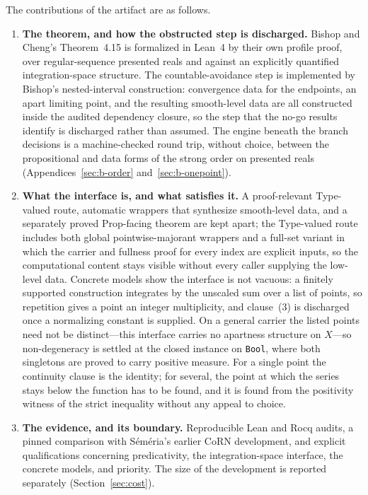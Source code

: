 \documentclass[11pt]{article}
\theoremstyle{definition}
\theoremstyle{remark}
\begin{document}
The contributions of the artifact are as follows.
\begin{enumerate}[label=(\arabic*)]
\item \textbf{The theorem, and how the obstructed step is discharged.}  Bishop and Cheng's Theorem~4.15 is formalized in Lean~4 by their own profile proof, over regular-sequence presented reals and against an explicitly quantified integration-space structure.  The countable-avoidance step is implemented by Bishop's nested-interval construction: convergence data for the endpoints, an apart limiting point, and the resulting smooth-level data are all constructed inside the audited dependency closure, so the step that the no-go results identify is discharged rather than assumed.  The engine beneath the branch decisions is a machine-checked round trip, without choice, between the propositional and data forms of the strong order on presented reals (Appendices~\ref{sec:b-order} and~\ref{sec:b-onepoint}).

\item \textbf{What the interface is, and what satisfies it.}  A proof-relevant Type-valued route, automatic wrappers that synthesize smooth-level data, and a separately proved Prop-facing theorem are kept apart; the Type-valued route includes both global pointwise-majorant wrappers and a full-set variant in which the carrier and fullness proof for every index are explicit inputs, so the computational content stays visible without every caller supplying the low-level data.  Concrete models show the interface is not vacuous: a finitely supported construction integrates by the unscaled sum over a list of points, so repetition gives a point an integer multiplicity, and clause~(3) is discharged once a normalizing constant is supplied.  On a general carrier the listed points need not be distinct---this interface carries no apartness structure on $X$---so non-degeneracy is settled at the closed instance on \texttt{Bool}, where both singletons are proved to carry positive measure.  For a single point the continuity clause is the identity; for several, the point at which the series stays below the function has to be found, and it is found from the positivity witness of the strict inequality without any appeal to choice.

\item \textbf{The evidence, and its boundary.}  Reproducible Lean and Rocq audits, a pinned comparison with S\'em\'eria's earlier CoRN development, and explicit qualifications concerning predicativity, the integration-space interface, the concrete models, and priority.  The size of the development is reported separately (Section~\ref{sec:cost}).
\end{enumerate}
\end{document}
